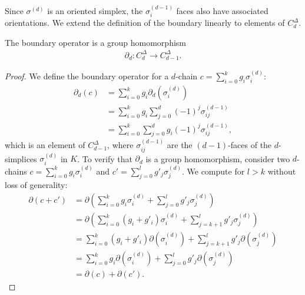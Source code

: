 Since \( \sigma^{(d)} \) is an oriented simplex, the \( \sigma^{(d-1)}_{i} \) faces also have associated orientations. We extend the definition of the boundary linearly to elements of \( C^{\Delta}_{d} \).

\begin{lemma}
	The boundary operator is a group homomorphism
	\begin{align}
		\partial_d: C^{\Delta}_{d} \to C^{\Delta}_{d-1}. 
	\end{align}
\end{lemma}

\begin{proof}
	We define the boundary operator for a \( d \)-chain \( c = \sum_{i=0}^{k} g_{i} \sigma_{i}^{(d)} \):
	\begin{align}
		\partial_d(c) & = \sum_{i=0}^{k} g_{i} \partial_d(\sigma_{i}^{(d)})                    \\
		            & = \sum_{i=0}^{k} g_{i} \sum_{j=0}^{d} (-1)^{j} \sigma_{ij}^{(d-1)}  \\
		            & = \sum_{i=0}^{k} \sum_{j=0}^{d} g_{i} (-1)^{j} \sigma_{ij}^{(d-1)}, 
	\end{align}
	which is an element of \( C^{\Delta}_{d-1} \), where \( \sigma_{ij}^{(d-1)} \) are the \( (d-1) \)-faces of the \( d \)-simplices \( \sigma_{i}^{(d)} \) in \( K \). To verify that \( \partial_d \) is a group homomorphism, consider two \( d \)-chains \( c = \sum_{i=0}^{k} g_{i} \sigma_{i}^{(d)} \) and \( c' = \sum_{j=0}^{l} g'_{j} \sigma_{j}^{(d)} \). We compute for $l > k$ without loss of generality:
	\begin{align}
		\partial(c + c') & = \partial\left( \sum_{i=0}^{k} g_{i} \sigma_{i}^{(d)} + \sum_{j=0}^{l} g'_{j} \sigma_{j}^{(d)} \right) \\
		                 & = \partial\left( \sum_{i=0}^{k} (g_{i} + g'_i) \sigma_{i}^{(d)} + \sum_{j=k+1}^{l} g'_{j} \sigma_{j}^{(d)} \right) \\
		                 & = \sum_{i=0}^{k} (g_{i}+g'_i) \partial(\sigma_{i}^{(d)}) + \sum_{j=k+1}^{l} g'_{j} \partial(\sigma_{j}^{(d)})    \\
		                 & = \sum_{i=0}^{k} g_{i} \partial(\sigma_{i}^{(d)}) + \sum_{j=0}^{l} g'_{j} \partial(\sigma_{j}^{(d)})    \\
		                 & = \partial(c) + \partial(c').                                                                           
	\end{align}
\end{proof}

